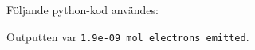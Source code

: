 
\usepackage{pdfpages}
\usepackage{incgraph}



	
Följande python-kod användes:


Outputten var \texttt{1.9e-09 mol electrons emitted}.



